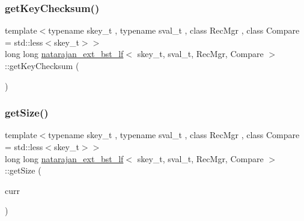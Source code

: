\mbox{\label{classnatarajan__ext__bst__lf_a6120769d8b8d6a14e673649d6ece6454}} 
\subsubsection{\texorpdfstring{get\+Key\+Checksum()}{getKeyChecksum()}\hspace{0.1cm}{\footnotesize\ttfamily [4/4]}}
{\footnotesize\ttfamily template$<$typename skey\+\_\+t , typename sval\+\_\+t , class Rec\+Mgr , class Compare  = std\+::less$<$skey\+\_\+t$>$$>$ \\
long long \hyperlink{classnatarajan__ext__bst__lf}{natarajan\+\_\+ext\+\_\+bst\+\_\+lf}$<$ skey\+\_\+t, sval\+\_\+t, Rec\+Mgr, Compare $>$\+::get\+Key\+Checksum (\begin{DoxyParamCaption}{ }\end{DoxyParamCaption})\hspace{0.3cm}{\ttfamily [inline]}}

\mbox{\label{classnatarajan__ext__bst__lf_a71a59c42d573aa3150a7a46d9ca94041}} 
\subsubsection{\texorpdfstring{get\+Size()}{getSize()}\hspace{0.1cm}{\footnotesize\ttfamily [1/4]}}
{\footnotesize\ttfamily template$<$typename skey\+\_\+t , typename sval\+\_\+t , class Rec\+Mgr , class Compare  = std\+::less$<$skey\+\_\+t$>$$>$ \\
long long \hyperlink{classnatarajan__ext__bst__lf}{natarajan\+\_\+ext\+\_\+bst\+\_\+lf}$<$ skey\+\_\+t, sval\+\_\+t, Rec\+Mgr, Compare $>$\+::get\+Size (\begin{DoxyParamCaption}\item[{\hyperlink{structnode__t}{node\+\_\+t}$<$ skey\+\_\+t, sval\+\_\+t $>$ $\ast$}]{curr }\end{DoxyParamCaption})\hspace{0.3cm}{\ttfamily [inline]}}


